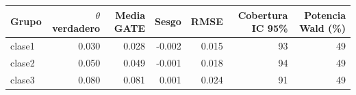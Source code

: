 \begin{tabular}{lrrrrrr}
\toprule
Grupo & $\theta$ verdadero & Media GATE & Sesgo & RMSE & Cobertura IC 95\% & Potencia Wald (\%) \\
\midrule
clase1 & 0.030 & 0.028 & -0.002 & 0.015 & 93 & 49 \\
clase2 & 0.050 & 0.049 & -0.001 & 0.018 & 94 & 49 \\
clase3 & 0.080 & 0.081 & 0.001 & 0.024 & 91 & 49 \\
\bottomrule
\end{tabular}